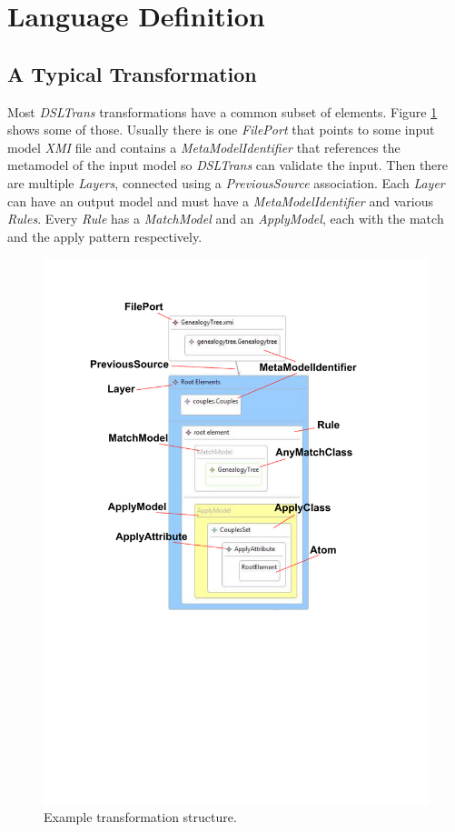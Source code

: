 \section{Language Definition}
\label{sec:language_def}

\subsection{A Typical Transformation}

Most \emph{DSLTrans} transformations have a common subset of elements. Figure
\ref{fig:example_transformation_structure} shows some of those. Usually there is
one \emph{FilePort} that points to some input model \emph{XMI} file and contains
a \emph{MetaModelIdentifier} that references the metamodel of the input model so
\emph{DSLTrans} can validate the input. Then there are multiple \emph{Layers},
connected using a \emph{PreviousSource} association. Each \emph{Layer} can have
an output model and must have a \emph{MetaModelIdentifier} and various
\emph{Rules}. Every \emph{Rule} has a \emph{MatchModel} and an
\emph{ApplyModel}, each with the match and the apply pattern respectively.

\begin{figure}[h]
\begin{center}
  \includegraphics[scale=0.6, trim=2.3cm 10.2cm 3.6cm 2.2cm,
  clip]{imgs/example_transformation_structure.pdf}
  \caption{Example transformation structure.}
  \label{fig:example_transformation_structure}
\end{center}
\end{figure}

